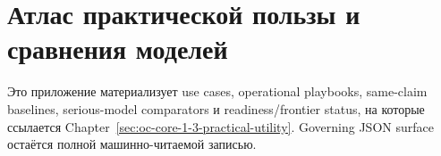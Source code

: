 \section{Атлас практической пользы и сравнения моделей}
\label{sec:oc-core-1-3-practical-utility-atlas}

Это приложение материализует use cases, operational playbooks,
same-claim baselines, serious-model comparators и readiness/frontier status,
на которые ссылается Chapter~\ref{sec:oc-core-1-3-practical-utility}.
Governing JSON surface остаётся полной машинно-читаемой записью.

\begingroup
\footnotesize
\RaggedRight
\setlength{\emergencystretch}{1.2em}
\setlength{\tabcolsep}{2pt}
\setlength{\LTleft}{0pt}
\setlength{\LTright}{0pt}

\endgroup
